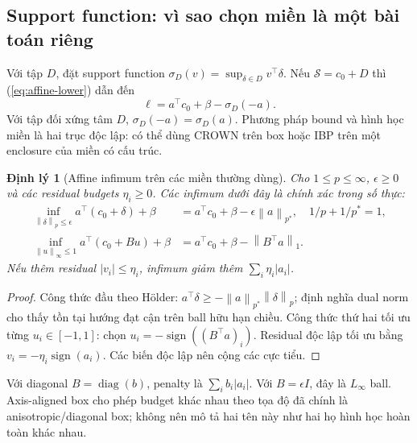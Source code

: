 \documentclass[11pt,a4paper]{article}
\newcommand{\norm}[1]{\left\lVert #1\right\rVert}
\newcommand{\diag}{\operatorname{diag}}
\newcommand{\Sset}{\mathcal S}
\newtheorem{theorem}[definition]{Định lý}
\theoremstyle{remark}
\begin{document}
\subsection{Support function: vì sao chọn miền là một bài toán riêng}
Với tập $D$, đặt support function $\sigma_D(v)=\sup_{\delta\in D}v^\top\delta$.
Nếu $\Sset=c_0+D$ thì (\ref{eq:affine-lower}) dẫn đến
\begin{equation}
 \ell=a^\top c_0+\beta-\sigma_D(-a).
 \label{eq:support}
\end{equation}
Với tập đối xứng tâm $D$, $\sigma_D(-a)=\sigma_D(a)$.
Phương pháp bound và hình học miền là hai trục độc lập: có thể dùng CROWN
trên box hoặc IBP trên một enclosure của miền có cấu trúc.

\begin{theorem}[Affine infimum trên các miền thường dùng]\label{th:support}
Cho $1\le p\le\infty$, $\epsilon\ge0$ và các residual budgets
$\eta_i\ge0$. Các infimum dưới đây là chính xác trong số thực:
\begin{align}
\inf_{\norm{\delta}_p\le\epsilon}a^\top(c_0+\delta)+\beta
 &=a^\top c_0+\beta-\epsilon\norm{a}_{p^*},
 \quad 1/p+1/p^*=1,\label{eq:dual}\\
\inf_{\norm{u}_\infty\le1}a^\top(c_0+Bu)+\beta
 &=a^\top c_0+\beta-\norm{B^\top a}_1.\label{eq:general-box}
\end{align}
Nếu thêm residual $|v_i|\le\eta_i$, infimum giảm thêm
$\sum_i\eta_i|a_i|$.
\end{theorem}
\begin{proof}
Công thức đầu theo Hölder: $a^\top\delta\ge-\norm{a}_{p^*}\norm{\delta}_p$;
định nghĩa dual norm cho thấy tồn tại hướng đạt cận trên ball hữu hạn chiều.
Công thức thứ hai tối ưu từng $u_i\in[-1,1]$: chọn
$u_i=-\operatorname{sign}((B^\top a)_i)$. Residual độc lập tối ưu bằng
$v_i=-\eta_i\operatorname{sign}(a_i)$. Các biến độc lập nên cộng các cực tiểu.
\end{proof}
Với diagonal $B=\diag(b)$, penalty là $\sum_i b_i|a_i|$.
Với $B=\epsilon I$, đây là $L_\infty$ ball. Axis-aligned box cho phép
budget khác nhau theo tọa độ đã chính là anisotropic/diagonal box; không
nên mô tả hai tên này như hai họ hình học hoàn toàn khác nhau.
\end{document}
